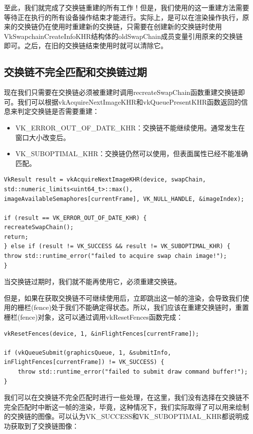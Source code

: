 \documentclass{ctexart}
\begin{document}
至此，我们就完成了交换链重建的所有工作！但是，我们使用的这一重建方法需要等待正在执行的所有设备操作结束才能进行。实际上，是可以在渲染操作执行，原来的交换链仍在使用时重建新的交换链，只需要在创建新的交换链时使用VkSwapchainCreateInfoKHR结构体的oldSwapChain成员变量引用原来的交换链即可。之后，在旧的交换链结束使用时就可以清除它。

\subsection{交换链不完全匹配和交换链过期}

现在我们只需要在交换链必须被重建时调用recreateSwapChain函数重建交换链即可。我们可以根据vkAcquireNextImageKHR和vkQueuePresentKHR函数返回的信息来判定交换链是否需要重建：

\begin{itemize}
	\item VK\_ERROR\_OUT\_OF\_DATE\_KHR：交换链不能继续使用。通常发生在窗口大小改变后。
	\item VK\_SUBOPTIMAL\_KHR：交换链仍然可以使用，但表面属性已经不能准确匹配。
\end{itemize}

\begin{lstlisting}[language={[ANSI]C}]
VkResult result = vkAcquireNextImageKHR(device, swapChain, std::numeric_limits<uint64_t>::max(),
imageAvailableSemaphores[currentFrame], VK_NULL_HANDLE, &imageIndex);

if (result == VK_ERROR_OUT_OF_DATE_KHR) {
recreateSwapChain();
return;
} else if (result != VK_SUCCESS && result != VK_SUBOPTIMAL_KHR) {
throw std::runtime_error("failed to acquire swap chain image!");
}
\end{lstlisting}

当交换链过期时，我们就不能再使用它，必须重建交换链。

但是，如果在获取交换链不可继续使用后，立即跳出这一帧的渲染，会导致我们使用的栅栏(fence)处于我们不能确定得状态。所以，我们应该在重建交换链时，重置栅栏(fence)对象，这可以通过调用vkResetFences函数完成：

\begin{lstlisting}[language={[ANSI]C}]
vkResetFences(device, 1, &inFlightFences[currentFrame]);

if (vkQueueSubmit(graphicsQueue, 1, &submitInfo, inFlightFences[currentFrame]) != VK_SUCCESS) {
	throw std::runtime_error("failed to submit draw command buffer!");
}
\end{lstlisting}

我们可以在交换链不完全匹配时进行一些处理，在这里，我们没有选择在交换链不完全匹配时中断这一帧的渲染，毕竟，这种情况下，我们实际取得了可以用来绘制的交换链的图像。可以认为VK\_SUCCESS和VK\_SUBOPTIMAL\_KHR都说明成功获取到了交换链图像：
\end{document}
